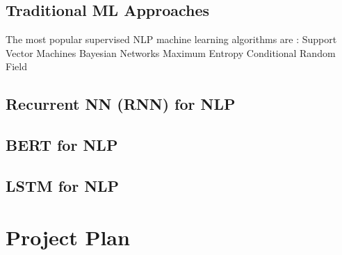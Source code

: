 \documentclass[a4paper,10pt]{article}
\begin{document}
\subsection{Traditional ML Approaches}

The most popular supervised NLP machine learning algorithms are \cite{ml_nlp}:
Support Vector Machines
Bayesian Networks
Maximum Entropy
Conditional Random Field

\subsection{Recurrent NN (RNN) for NLP}
\subsection{BERT for NLP}
\subsection{LSTM for NLP}



\section{Project Plan}
\label{sec:project_plan}


\medskip
\newpage
\begin{appendices}
	
	
\end{appendices}

\newpage



\end{document}
